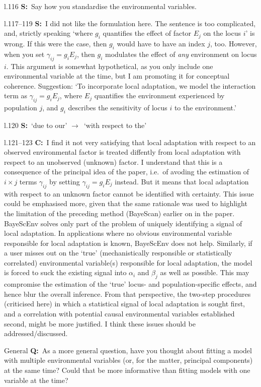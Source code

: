 \documentclass[11pt]{article}
\newenvironment{my_description}
{\begin{description}
  \setlength{\itemsep}{2pt}
  \setlength{\parskip}{0pt}
  \setlength{\parsep}{0pt}}
{\end{description}}
\newcommand{\ra}{$\rightarrow$\ }
\newcommand{\C}{\textbf{C:}\ }
\newcommand{\Q}{\textbf{Q:}\ }
\newcommand{\V}{\textbf{S:}\ }
\begin{document}
\begin{my_description}
	\item[l.116] \V Say how you standardise the environmental variables.
	\item[l.117--119] \V I did not like the formulation here. The sentence is too complicated, and, strictly speaking `where $g_i$ quantifies the effect of factor $E_j$ on the locus $i$' is wrong. If this were the case, then $g_i$ would have to have an index $j$, too. However, when you set $\gamma_{ij} = g_i E_j$, then $g_i$ modulates the effect of \emph{any} environment on locus $i$. This argument is somewhat hypothetical, as you only include one environmental variable at the time, but I am promoting it for conceptual coherence. Suggestion: `To incorporate local adaptation, we model the interaction term as $\gamma_{ij} = g_{i} E_{j}$, where $E_j$ quantifies the environment experienced by population $j$, and $g_i$ describes the sensitivity of locus $i$ to the environment.'
	\item[l.120] \V `due to our' \ra `with respect to the'
	\item[l.121--123] \C I find it not very satisfying that local adaptation with respect to an observed environmental factor is treated diffently from local adaptation with respect to an unobserved (unknown) factor. I understand that this is a consequence of the principal idea of the paper, i.e.\ of avoding the estimation of $i \times j$ terms $\gamma_{ij}$ by setting $\gamma_{ij} = g_i E_j$ instead. But it means that local adaptation with respect to an unknown factor cannot be identified with certainty.
This issue could be emphasised more, given that the same rationale was used to highlight the limitation of the preceding method (BayeScan) earlier on in the paper. BayeScEnv solves only part of the problem of uniquely identifying a signal of local adaptation. In applications where no obvious environmental variable responsible for local adaptation is known, BayeScEnv does not help.
Similarly, if a user misses out on the `true' (mechanistically responsible or statistically correlated) environmental variable(s) responsible for local adaptation, the model is forced to suck the existing signal into $\alpha_i$ and $\beta_j$ as well as possible. This may compromise the estimation of the `true' locus- and population-specific effects, and hence blur the overall inference. From that perspective, the two-step procedures (criticised here) in which a statistical signal of local adaptation is sought first, and a correlation with potential causal environmental variables established second, might be more justified.
I think these issues should be addressed/discussed.
	
	\item[General] \Q As a more general question, have you thought about fitting a model with multiple environmental variables (or, for the matter, principal components) at the same time? Could that be more informative than fitting models with one variable at the time?
	
\end{my_description}
\end{document}
